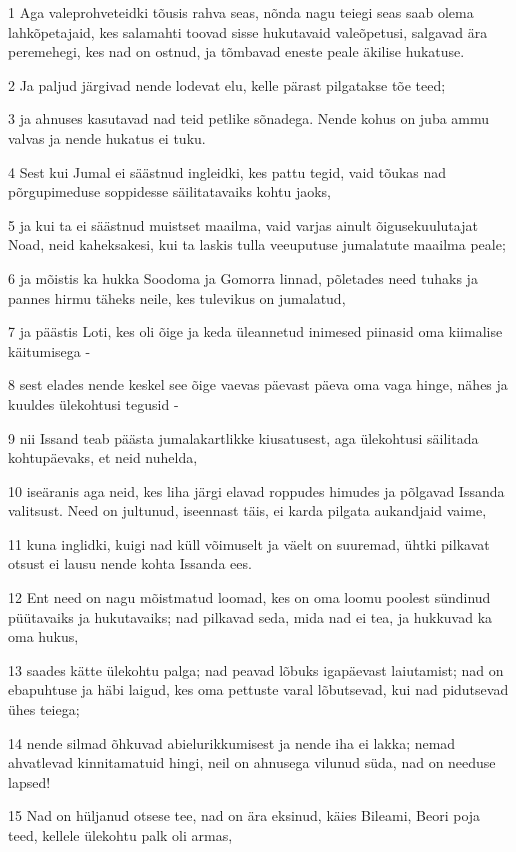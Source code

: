 \par 1 Aga valeprohveteidki tõusis rahva seas, nõnda nagu teiegi seas saab olema lahkõpetajaid, kes salamahti toovad sisse hukutavaid valeõpetusi, salgavad ära peremehegi, kes nad on ostnud, ja tõmbavad eneste peale äkilise hukatuse.
\par 2 Ja paljud järgivad nende lodevat elu, kelle pärast pilgatakse tõe teed;
\par 3 ja ahnuses kasutavad nad teid petlike sõnadega. Nende kohus on juba ammu valvas ja nende hukatus ei tuku.
\par 4 Sest kui Jumal ei säästnud ingleidki, kes pattu tegid, vaid tõukas nad põrgupimeduse soppidesse säilitatavaiks kohtu jaoks,
\par 5 ja kui ta ei säästnud muistset maailma, vaid varjas ainult õigusekuulutajat Noad, neid kaheksakesi, kui ta laskis tulla veeuputuse jumalatute maailma peale;
\par 6 ja mõistis ka hukka Soodoma ja Gomorra linnad, põletades need tuhaks ja pannes hirmu täheks neile, kes tulevikus on jumalatud,
\par 7 ja päästis Loti, kes oli õige ja keda üleannetud inimesed piinasid oma kiimalise käitumisega -
\par 8 sest elades nende keskel see õige vaevas päevast päeva oma vaga hinge, nähes ja kuuldes ülekohtusi tegusid -
\par 9 nii Issand teab päästa jumalakartlikke kiusatusest, aga ülekohtusi säilitada kohtupäevaks, et neid nuhelda,
\par 10 iseäranis aga neid, kes liha järgi elavad roppudes himudes ja põlgavad Issanda valitsust. Need on jultunud, iseennast täis, ei karda pilgata aukandjaid vaime,
\par 11 kuna inglidki, kuigi nad küll võimuselt ja väelt on suuremad, ühtki pilkavat otsust ei lausu nende kohta Issanda ees.
\par 12 Ent need on nagu mõistmatud loomad, kes on oma loomu poolest sündinud püütavaiks ja hukutavaiks; nad pilkavad seda, mida nad ei tea, ja hukkuvad ka oma hukus,
\par 13 saades kätte ülekohtu palga; nad peavad lõbuks igapäevast laiutamist; nad on ebapuhtuse ja häbi laigud, kes oma pettuste varal lõbutsevad, kui nad pidutsevad ühes teiega;
\par 14 nende silmad õhkuvad abielurikkumisest ja nende iha ei lakka; nemad ahvatlevad kinnitamatuid hingi, neil on ahnusega vilunud süda, nad on needuse lapsed!
\par 15 Nad on hüljanud otsese tee, nad on ära eksinud, käies Bileami, Beori poja teed, kellele ülekohtu palk oli armas,
